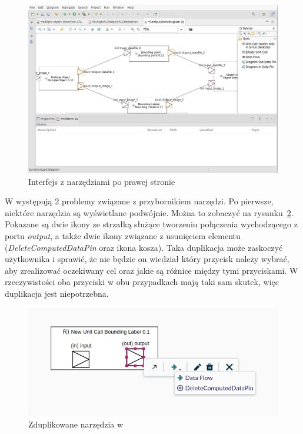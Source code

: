 \begin{figure}[!ht]
  \centering

  \includegraphics[width=0.95\linewidth]{./images/sirius-desktop-model-editor.png}
  \caption{Interfejs \SiriusDesktop{} z narzędziami po prawej
    stronie}\label{rys:sirius-desktop-model-editor-tools-right}
\end{figure}

W \SiriusWeb{} występują 2 problemy związane z przybornikiem narzędzi. Po
pierwsze, niektóre narzędzia są wyświetlane podwójnie. Można to zobaczyć na
rysunku~\ref{rys:sirius-web-duplicate-tools}. Pokazane są dwie ikony ze
strzałką służące tworzeniu połączenia wychodzącego z portu \emph{output}, a
także dwie ikony związane z usunięciem elementu (\emph{DeleteComputedDataPin}
oraz ikona kosza). Taka duplikacja może zaskoczyć użytkownika i sprawić, że nie
będzie on wiedział który przycisk należy wybrać, aby zrealizować oczekiwany cel
oraz jakie są różnice między tymi przyciskami. W rzeczywistości oba przyciski w
obu przypadkach mają taki sam skutek, więc duplikacja jest niepotrzebna.

\begin{figure}[!ht]
  \centering

  \includegraphics[width=0.95\linewidth]{./images/sirius-web-duplicate-tools.png}
  \caption{Zduplikowane narzędzia w \SiriusWeb{}}\label{rys:sirius-web-duplicate-tools}
\end{figure}

